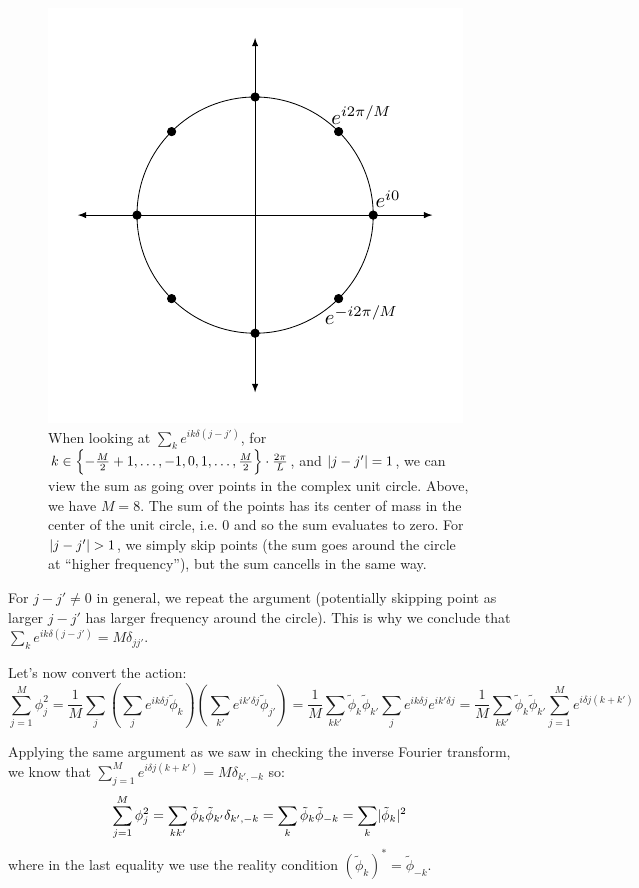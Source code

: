\begin{figure}[htbp]
    \centering
    \includegraphics[]{Lectures/Figures/unit_circle_sum.pdf}
    \caption{When looking at $\sum_k e^{ik\delta(j - j')}$, for $k \in \set{-\frac{M}{2} + 1, \ldots, -1, 0, 1, \ldots, \frac{M}{2}} \cdot \frac{2\pi}{L}$, and $\lvert j-j' \rvert=1$, we can view the sum as going over points in the complex unit circle. Above, we have $M = 8$. The sum of the points has its center of mass in the center of the unit circle, i.e. $0$ and so the sum evaluates to zero. For $\lvert j - j' \rvert > 1$, we simply skip points (the sum goes around the circle at ``higher frequency''), but the sum cancells in the same way.}
    \label{fig:unit_circle_sum}
\end{figure}

For $j - j' \neq 0$ in general, we repeat the argument (potentially skipping point as larger $j-j'$ has larger frequency around the circle). This is why we conclude that $\sum_{k}e^{ik\delta(j-j')} = M\delta_{jj'}$.

Let's now convert the action:
\begin{equation}
    \sum_{j=1}^M \phi_j^2 = \frac{1}{M}\sum_j\left(\sum_{j}e^{ik\delta j}\tilde{\phi}_k\right)\left(\sum_{k'}e^{ik'\delta j}\tilde{\phi}_{j'}\right) = \frac{1}{M}\sum_{kk'}\tilde{\phi}_k\tilde{\phi}_{k'}\sum_j e^{ik\delta j}e^{ik'\delta j} = \frac{1}{M}\sum_{kk'}\tilde{\phi}_k\tilde{\phi}_{k'} \sum_{j=1}^M e^{i\delta j (k + k')}
\end{equation}

Applying the same argument as we saw in checking the inverse Fourier transform, we know that $\sum_{j=1}^M e^{i\delta j (k + k')} = M\delta_{k', -k}$ so:
\begin{equation}
    \sum_{j=1}^M \phi_j^2 = \sum_{kk'}\tilde{\phi}_k\tilde{\phi}_{k'}\delta_{k',-k} = \sum_k \tilde{\phi}_k\tilde{\phi}_{-k} = \sum_{k}\lvert \tilde{\phi}_k \rvert^2
\end{equation}
where in the last equality we use the reality condition $(\tilde{\phi}_k)^* = \tilde{\phi}_{-k}$.

